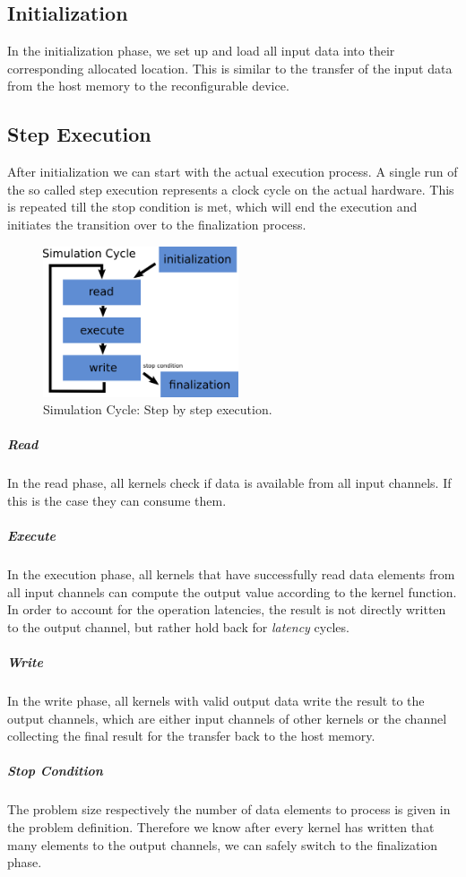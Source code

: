 \subsection{Initialization}
In the initialization phase, we set up and load all input data into their corresponding allocated location. This is similar to the transfer of the input data from the host memory to the reconfigurable device.


\subsection{Step Execution}
After initialization we can start with the actual execution process. A single run of the so called step execution represents a clock cycle on the actual hardware. This is repeated till the stop condition is met, which will end the execution and initiates the transition over to the finalization process.  
\begin{figure}[h]
	\centering
	\includegraphics[height=12em]{drawings/simulator-simulation-cycle.png}
	\caption{Simulation Cycle: Step by step execution.}
	\label{fig:simulator-simulation-cycle}
\end{figure}


\subparagraph{Read}
In the read phase, all kernels check if data is available from all input channels. If this is the case they can consume them.


\subparagraph{Execute}
In the execution phase, all kernels that have successfully read data elements from all input channels can compute the output value according to the kernel function. In order to account for the operation latencies, the result is not directly written to the output channel, but rather hold back for \textit{latency} cycles.


\subparagraph{Write}
In the write phase, all kernels with valid output data write the result to the output channels, which are either input channels of other kernels or the channel collecting the final result for the transfer back to the host memory.


\subparagraph{Stop Condition}
The problem size respectively the number of data elements to process is given in the problem definition. Therefore we know after every kernel has written that many elements to the output channels, we can safely switch to the finalization phase.


